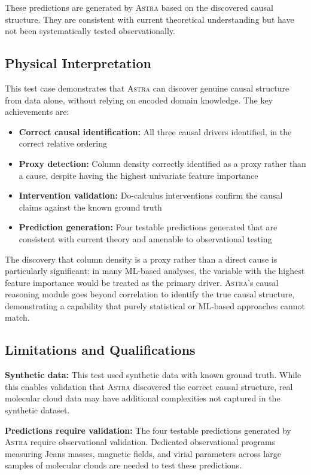 \documentclass[usenatbib]{rasti}
\newcommand{\astra}{\textsc{Astra}\xspace}
\begin{document}
These predictions are generated by \astra based on the discovered causal structure. They are consistent with current theoretical understanding but have not been systematically tested observationally.

\subsection{Physical Interpretation}
\label{sec:tc6:interpretation}

This test case demonstrates that \astra can discover genuine causal structure from data alone, without relying on encoded domain knowledge.
The key achievements are:
\begin{itemize}
  \item \textbf{Correct causal identification:} All three causal drivers identified, in the correct relative ordering
  \item \textbf{Proxy detection:} Column density correctly identified as a proxy rather than a cause, despite having the highest univariate feature importance
  \item \textbf{Intervention validation:} Do-calculus interventions confirm the causal claims against the known ground truth
  \item \textbf{Prediction generation:} Four testable predictions generated that are consistent with current theory and amenable to observational testing
\end{itemize}

The discovery that column density is a proxy rather than a direct cause is particularly significant: in many ML-based analyses, the variable with the highest feature importance would be treated as the primary driver.
\astra's causal reasoning module goes beyond correlation to identify the true causal structure, demonstrating a capability that purely statistical or ML-based approaches cannot match.

\subsection{Limitations and Qualifications}
\label{sec:tc6:limitations}

\textbf{Synthetic data:}
This test used synthetic data with known ground truth.
While this enables validation that \astra discovered the correct causal structure, real molecular cloud data may have additional complexities not captured in the synthetic dataset.

\textbf{Predictions require validation:}
The four testable predictions generated by \astra require observational validation.
Dedicated observational programs measuring Jeans masses, magnetic fields, and virial parameters across large samples of molecular clouds are needed to test these predictions.
\end{document}
